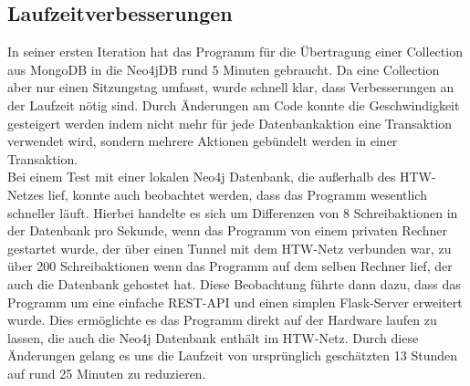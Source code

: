\subsection{Laufzeitverbesserungen}
In seiner ersten Iteration hat das Programm für die Übertragung einer Collection aus MongoDB in die Neo4jDB rund 5 Minuten gebraucht. Da eine Collection aber nur einen Sitzungstag umfasst, wurde schnell klar, dass Verbesserungen an der Laufzeit nötig sind. Durch Änderungen am Code konnte die Geschwindigkeit gesteigert werden indem nicht mehr für jede Datenbankaktion eine Transaktion verwendet wird, sondern mehrere Aktionen gebündelt werden in einer Transaktion.\\
Bei einem Test mit einer lokalen Neo4j Datenbank, die außerhalb des HTW-Netzes lief, konnte auch beobachtet werden, dass das Programm wesentlich schneller läuft. Hierbei handelte es sich um Differenzen von 8 Schreibaktionen in der Datenbank pro Sekunde, wenn das Programm von einem privaten Rechner gestartet wurde, der über einen Tunnel mit dem HTW-Netz verbunden war, zu über 200 Schreibaktionen wenn das Programm auf dem selben Rechner lief, der auch die Datenbank gehostet hat. Diese Beobachtung führte dann dazu, dass das Programm um eine einfache REST-API und einen simplen Flask-Server erweitert wurde. Dies ermöglichte es das Programm direkt auf der Hardware laufen zu lassen, die auch die Neo4j Datenbank enthält im HTW-Netz. Durch diese Änderungen gelang es uns die Laufzeit von ursprünglich geschätzten 13 Stunden auf rund 25 Minuten zu reduzieren.
